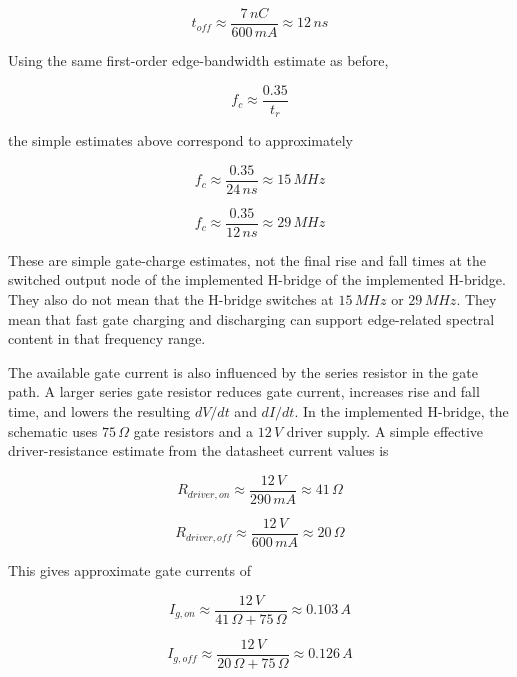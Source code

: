 \begin{equation}
t_{off} \approx \frac{7\,nC}{600\,mA} \approx 12\,ns
\end{equation}

Using the same first-order edge-bandwidth estimate as before,

\begin{equation}
f_c \approx \frac{0.35}{t_r}
\end{equation}

the simple estimates above correspond to approximately

\begin{equation}
f_c \approx \frac{0.35}{24\,ns} \approx 15\,MHz
\end{equation}

\begin{equation}
f_c \approx \frac{0.35}{12\,ns} \approx 29\,MHz
\end{equation}

These are simple gate-charge estimates, not the final rise and fall times at the
switched output node of the implemented H-bridge
of the implemented H-bridge. They also do not mean that the H-bridge switches at
\(15\,MHz\) or \(29\,MHz\). They mean that fast gate charging and discharging can
support edge-related spectral content in that frequency range.

The available gate current is also influenced by the series resistor in the gate path.
A larger series gate resistor reduces gate current, increases rise and fall time, and
lowers the resulting \(dV/dt\) and \(dI/dt\). In the implemented H-bridge, the
schematic uses \(75\,\Omega\) gate resistors and a \(12\,V\) driver supply. A simple
effective driver-resistance estimate from the datasheet current values is

\begin{equation}
R_{driver,on} \approx \frac{12\,V}{290\,mA} \approx 41\,\Omega
\end{equation}

\begin{equation}
R_{driver,off} \approx \frac{12\,V}{600\,mA} \approx 20\,\Omega
\end{equation}

This gives approximate gate currents of

\begin{equation}
I_{g,on} \approx \frac{12\,V}{41\,\Omega + 75\,\Omega} \approx 0.103\,A
\end{equation}

\begin{equation}
I_{g,off} \approx \frac{12\,V}{20\,\Omega + 75\,\Omega} \approx 0.126\,A
\end{equation}

